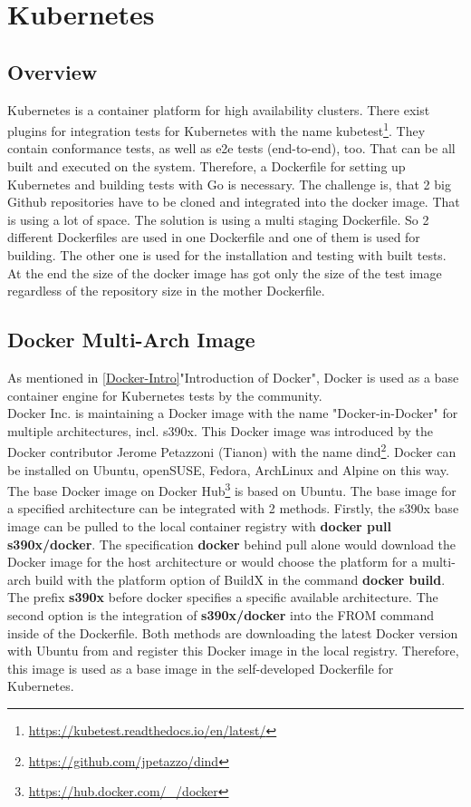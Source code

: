 \chapter{Kubernetes}\label{ch:kubernetes}

\section{Overview}

Kubernetes is a container platform for high availability clusters.
There exist plugins for integration tests for Kubernetes with the name kubetest\footnote{\url{https://kubetest.readthedocs.io/en/latest/}}. They contain conformance tests, as well as e2e tests (end-to-end), too.
That can be all built and executed on the system. Therefore, a Dockerfile for setting up Kubernetes and building tests with Go is necessary. The challenge is, that 2 big Github repositories have to be cloned and integrated into the docker image. That is using a lot of space. The solution is using a multi staging Dockerfile. 
So 2 different Dockerfiles are used in one Dockerfile and one of them is used for building. The other one is used for the installation and testing with built tests. At the end the size of the docker image has got only the size of the test image regardless of the repository size in the mother Dockerfile.

\section{Docker Multi-Arch Image}
As mentioned in \ref{Docker-Intro}"Introduction of Docker", Docker is used as a base container engine for Kubernetes tests by the community. \\  
Docker Inc. is maintaining a Docker image with the name "Docker-in-Docker" for multiple architectures, incl. s390x. 
This Docker image was introduced by the Docker contributor Jerome Petazzoni (Tianon) with the name dind\footnote{\url{https://github.com/jpetazzo/dind}}. Docker can be installed on Ubuntu, openSUSE, Fedora, ArchLinux and Alpine on this way.
The base Docker image on Docker Hub\footnote{\url{https://hub.docker.com/_/docker}} is based on Ubuntu.
The base image for a specified architecture can be integrated with 2 methods. Firstly, the s390x base image can be pulled to the local container registry with \textbf{docker pull s390x/docker}. The specification \textbf{docker} behind pull alone would download the Docker image for the host architecture or would choose the platform for a multi-arch build with the platform option of BuildX in the command \textbf{docker build}. The prefix \textbf{s390x} before docker specifies a specific available architecture. 
The second option is the integration of \textbf{s390x/docker} into the FROM command inside of the Dockerfile. Both methods are downloading the latest Docker version with Ubuntu from  and register this Docker image in the local registry.
Therefore, this image is used as a base image in the self-developed Dockerfile for Kubernetes.



